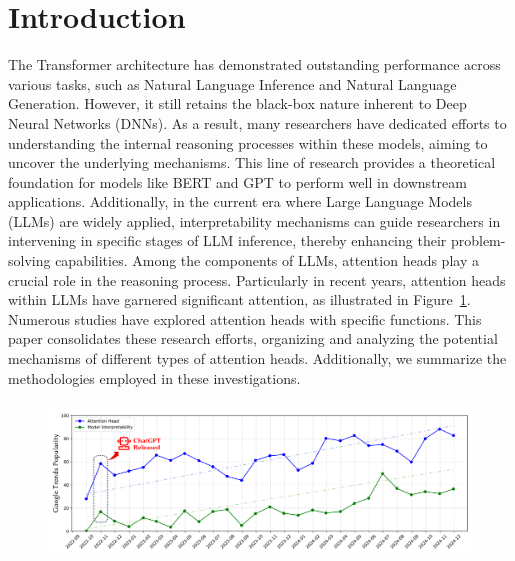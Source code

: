 \documentclass[12pt,letterpaper]{article}
\begin{document}
\section*{Introduction}
The Transformer architecture \citep{AttentionIsAllYouNeed} has demonstrated outstanding performance across various tasks, such as Natural Language Inference and Natural Language Generation. However, it still retains the black-box nature inherent to Deep Neural Networks (DNNs).\citep{LLMblackbox_gilpin2018, LLMblackbox_lipton2018} As a result, many researchers have dedicated efforts to understanding the internal reasoning processes within these models, aiming to uncover the underlying mechanisms.\citep{DNN_Interp_Montavon} This line of research provides a theoretical foundation for models like BERT \citep{BERT_MODEL} and GPT \citep{GPT2_MODEL} to perform well in downstream applications. Additionally, in the current era where Large Language Models (LLMs) are widely applied, interpretability mechanisms can guide researchers in intervening in specific stages of LLM inference, thereby enhancing their problem-solving capabilities.\citep{AttnLookback_24_arXiv_MIT, MaskLayer_24_arXiv_NUDT, ji2024llm}
Among the components of LLMs, attention heads play a crucial role in the reasoning process. Particularly in recent years, attention heads within LLMs have garnered significant attention, as illustrated in Figure~\ref{fig:google_trends}. Numerous studies have explored attention heads with specific functions. This paper consolidates these research efforts, organizing and analyzing the potential mechanisms of different types of attention heads. Additionally, we summarize the methodologies employed in these investigations.
\begin{figure}[!ht]
    \centering
    \includegraphics[width=\linewidth]{figures/google_trends.pdf}
    \caption{}
    \label{fig:google_trends}
\end{figure}
\end{document}
